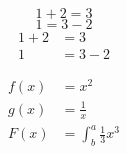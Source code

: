 \documentclass{article}
\begin{document}
\begin{equation*}
  1 + 2 = 3 
\end{equation*}
\begin{equation*}
  1 = 3 - 2
\end{equation*}
\begin{align*}
  1 + 2 &= 3\\
  1 &= 3 - 2
\end{align*}


\begin{align*}
  f(x) &= x^2\\
  g(x) &= \frac{1}{x}\\
  F(x) &= \int^a_b \frac{1}{3}x^3
\end{align*}


\left[
\begin{matrix}
1 & 0\\
0 & 1
\end{matrix}
\right]
\end{document}
